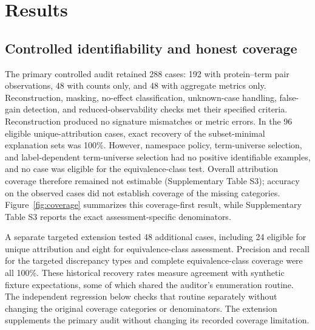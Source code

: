 \documentclass[11pt]{article}
\begin{document}
\section{Results}

\subsection{Controlled identifiability and honest coverage}
The primary controlled audit retained 288 cases: 192 with protein--term pair observations, 48 with counts only, and 48 with aggregate metrics only. Reconstruction, masking, no-effect classification, unknown-case handling, false-gain detection, and reduced-observability checks met their specified criteria. Reconstruction produced no signature mismatches or metric errors. In the 96 eligible unique-attribution cases, exact recovery of the subset-minimal explanation sets was 100\%. However, namespace policy, term-universe selection, and label-dependent term-universe selection had no positive identifiable examples, and no case was eligible for the equivalence-class test. Overall attribution coverage therefore remained not estimable (Supplementary Table S3); accuracy on the observed cases did not establish coverage of the missing categories. Figure~\ref{fig:coverage} summarizes this coverage-first result, while Supplementary Table S3 reports the exact assessment-specific denominators.

A separate targeted extension tested 48 additional cases, including 24 eligible for unique attribution and eight for equivalence-class assessment. Precision and recall for the targeted discrepancy types and complete equivalence-class coverage were all 100\%. These historical recovery rates measure agreement with synthetic fixture expectations, some of which shared the auditor's enumeration routine. The independent regression below checks that routine separately without changing the original coverage categories or denominators. The extension supplements the primary audit without changing its recorded coverage limitation.
\end{document}
